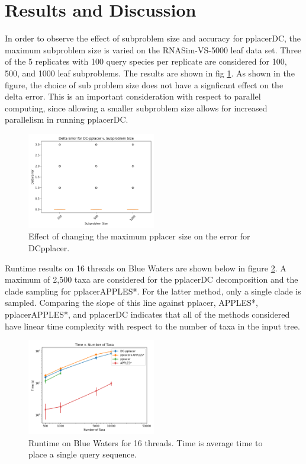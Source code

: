 \documentclass[10pt]{article}
\begin{document}
\section{Results and Discussion}

In order to observe the effect of subproblem size and accuracy for pplacerDC,
the maximum subproblem size is varied on the RNASim-VS-5000 leaf data set.
Three of the 5 replicates with 100 query species per replicate are
considered for 100, 500, and 1000 leaf subproblems.
The results are shown in fig \ref{fig:varying-size}.
As shown in the figure, the choice of sub problem size does not
have a signficant effect on the delta error.
This is an important consideration with respect to parallel computing,
since allowing a smaller subproblem size allows
for increased parallelism in running pplacerDC.

\begin{figure}
\centering
\includegraphics[width=0.5\textwidth]{Figs/varying-subproblem-size.png}
\caption{Effect of changing the maximum pplacer size on the error for DCpplacer.}
\label{fig:varying-size}
\end{figure}

Runtime results on 16 threads on Blue Waters are shown below in figure \ref{fig:timing-results}.
A maximum of 2,500 taxa are considered for the pplacerDC decomposition and the clade
sampling for pplacerAPPLES*.
For the latter method, only a single clade is sampled.
Comparing the slope of this line against pplacer, APPLES*, pplacerAPPLES*, and pplacerDC
indicates that all of the methods considered have linear time complexity with respect
to the number of taxa in the input tree.

\begin{figure}
\centering
\includegraphics[width=0.5\textwidth]{Figs/VS-timing-results-BW.png}
\caption{Runtime on Blue Waters for 16 threads. Time is average time to place a single query sequence.}
\label{fig:timing-results}
\end{figure}
\end{document}
